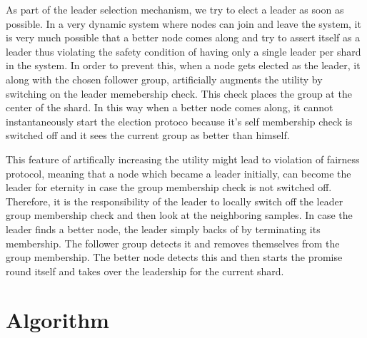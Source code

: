 \documentclass[a4paper, 11pt]{article}
\begin{document}
As part of the leader selection mechanism, we try to elect a leader as soon as possible. In a very dynamic system where nodes can join and leave the system, it is very much possible that a better node comes along and try to assert itself as a leader thus violating the safety condition of having only a single leader per shard in the system. In order to prevent this, when a node gets elected as the leader, it along with the chosen follower group, artificially augments the utility by switching on the leader memebership check. This check places the group at the center of the shard. In this way when a better node comes along, it cannot instantaneously start the election protoco because it's self membership check is switched off and it sees the current group as better than himself. 

\par This feature of artifically increasing the utility might lead to violation of fairness protocol, meaning that a node which became a leader initially, can become the leader for eternity in case the group membership check is not switched off. Therefore, it is the responsibility of the leader to locally switch off the leader group membership check and then look at the neighboring samples. In case the leader finds a better node, the leader simply backs of by terminating its membership. The follower group detects it and removes themselves from the group membership. The better node detects this and then starts the promise round itself and takes over the leadership for the current shard.



\section{Algorithm}
\end{document}
